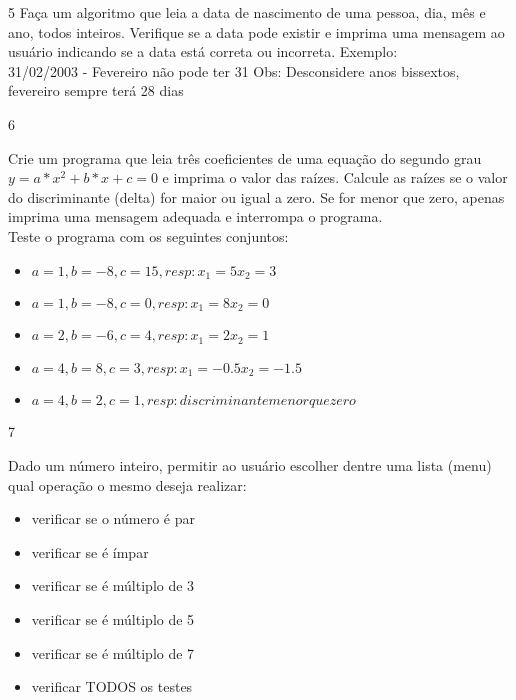 \begin{exercicio}
  {5}
  {Faça um algoritmo que leia a data de nascimento de uma pessoa, dia, mês e ano, todos inteiros. Verifique se a data pode existir e imprima uma mensagem ao usuário indicando se a data está correta ou incorreta.}
  Exemplo: \\
  31/02/2003 - Fevereiro não pode ter 31
  Obs: Desconsidere anos bissextos, fevereiro sempre terá 28 dias
\end{exercicio}

\begin{exercicio}
  {6}
  {Crie um programa que leia três coeficientes de uma equação do segundo grau $y=a*x^2 + b*x + c = 0$ e imprima o valor das raízes. Calcule as raízes se o valor do discriminante (delta) for maior ou igual a zero. Se for menor que zero, apenas imprima uma mensagem adequada e interrompa o programa. \\
  Teste o programa com os seguintes conjuntos: \\
  \begin{itemize}
    \item $a = 1, b = -8, c = 15, resp: x_{1} = 5 x_{2} = 3$
    \item $a = 1, b = -8, c = 0, resp: x_{1} = 8 x_{2} = 0$
    \item $a = 2, b = -6, c = 4, resp: x_{1} = 2 x_{2} = 1$
    \item $a = 4, b = 8, c = 3, resp: x_{1} = -0.5 x_{2} = -1.5$
    \item $a = 4, b = 2, c = 1, resp: discriminante menor que zero$
  \end{itemize}}
\end{exercicio}

\begin{exercicio}
  {7}
  {Dado um número inteiro, permitir ao usuário escolher dentre uma lista (menu) qual operação o mesmo deseja realizar: \\
  \begin{itemize}
    \item verificar se o número é par
    \item verificar se é ímpar
    \item verificar se é múltiplo de 3
    \item verificar se é múltiplo de 5
    \item verificar se é múltiplo de 7
    \item verificar TODOS os testes
  \end{itemize}}
\end{exercicio}


